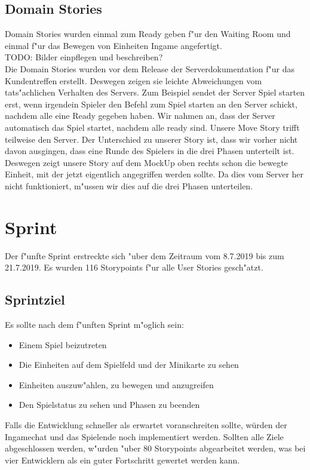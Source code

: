\documentclass[12pt, titlepage]{scrartcl}
\newcommand{\RN}[1]{%
	\textup{\uppercase\expandafter{\romannumeral#1}}%
}
\begin{document}
		\subsection{Domain Stories}
		    Domain Stories wurden einmal zum Ready geben f"ur den Waiting Room und einmal f"ur das Bewegen von Einheiten Ingame angefertigt. \\
		    TODO: Bilder einpflegen und beschreiben?
		    \ \\ Die Domain Stories wurden vor dem Release der Serverdokumentation f"ur das Kundentreffen erstellt. Deswegen zeigen sie leichte Abweichungen vom tats"achlichen Verhalten des Servers. Zum Beispiel sendet der Server Spiel starten erst, wenn irgendein Spieler den Befehl zum Spiel starten an den Server schickt, nachdem alle eine Ready gegeben haben. Wir nahmen an, dass der Server automatisch das Spiel startet, nachdem alle ready sind. Unsere Move Story trifft teilweise den Server. Der Unterschied zu unserer Story ist, dass wir vorher nicht davon ausgingen, dass eine Runde des Spielers in die drei Phasen unterteilt ist. Deswegen zeigt unsere Story auf dem MockUp oben rechts schon die bewegte Einheit, mit der jetzt eigentlich angegriffen werden sollte. Da dies vom Server her nicht funktioniert, m"ussen wir dies auf die drei Phasen unterteilen.
	\newpage
	\section{Sprint \RN{5}}
	    Der f"unfte Sprint erstreckte sich "uber dem Zeitraum vom 8.7.2019 bis zum 21.7.2019. Es wurden 116 Storypoints f"ur alle User Stories gesch"atzt.
	    \subsection{Sprintziel} \label{Sprintgoal_5}
	        Es sollte nach dem f"unften Sprint m"oglich sein:
	        \begin{itemize}
	            \item Einem Spiel beizutreten
	            \item Die Einheiten auf dem Spielfeld und der Minikarte zu sehen
	            \item Einheiten auszuw"ahlen, zu bewegen und anzugreifen
	            \item Den Spielstatus zu sehen und Phasen zu beenden
	        \end{itemize}
	        Falls die Entwicklung schneller als erwartet voranschreiten sollte, würden der Ingamechat und das Spielende noch implementiert werden. Sollten alle Ziele abgeschlossen werden, w"urden "uber 80 Storypoints abgearbeitet werden, was bei vier Entwicklern als ein guter Fortschritt gewertet werden kann.
\end{document}
